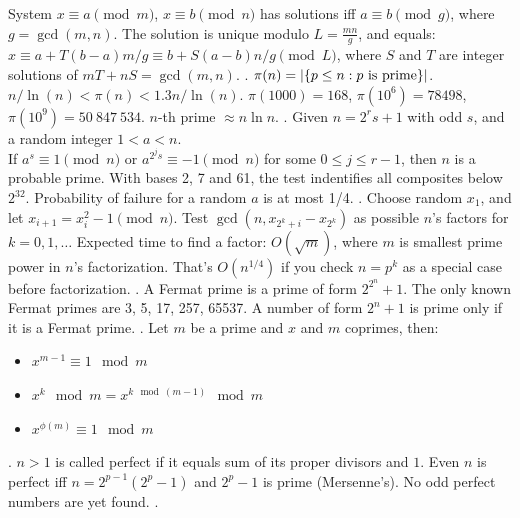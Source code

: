 System $x \equiv a \pmod{m}$, $x \equiv b \pmod{n}$ has solutions
iff $a \equiv b \pmod{g}$, where $g=\gcd(m,n)$.
The solution is unique modulo $L=\frac{mn}{g}$, and equals:
$x \equiv a + T(b-a) m/g \equiv b + S(a-b) n/g \pmod{L}$,
where $S$ and $T$ are integer solutions of $mT + nS = \gcd(m,n)$. \TopicBreak
{}. $\pi(n) = |\{p \le n : p \hbox{ is prime}\}|$.
$n/\ln(n) < \pi(n) < 1.3 n/\ln(n)$.
$\pi(1000) = 168$, $\pi(10^6) = 78498$, $\pi(10^9) = 50\ 847\ 534$.
\quad $n$-th prime $\approx n \ln n$. \TopicBreak
{}.
Given $n = 2^r s + 1$ with odd $s$, and a random integer $1 < a < n$. \\
If $a^s \equiv 1 {\pmod n}$ or $a^{2^j s} \equiv -1 {\pmod n}$ for some
$0 \le j \le r-1$, then $n$ is a probable prime.
With bases 2, 7 and 61, the test indentifies all composites below $2^{32}$.
Probability of failure for a random $a$ is at most 1/4. \TopicBreak
{}.
Choose random $x_1$, and let $x_{i+1} = x_i^2 - 1 \pmod{n}$.
Test $\gcd(n, x_{2^k+i} - x_{2^k})$ as possible $n$'s factors for $k=0,1,\ldots$
Expected time to find a factor: $O(\sqrt{m})$, where $m$ is smallest
prime power in $n$'s factorization.
That's $O(n^{1/4})$ if you check $n = p^k$ as a special case before factorization. \TopicBreak
{}.  A Fermat prime is a prime of form $2^{2^n}+1$.
The only known Fermat primes are 3, 5, 17, 257, 65537.
A number of form $2^n+1$ is prime only if it is a Fermat prime. \TopicBreak
{}. Let $m$ be a prime and $x$ and $m$ coprimes, then:
\begin{itemize}
\item $x^{m-1} \equiv 1 \mod m $
\item $x^{k} \mod m = x^{k \mod (m-1)} \mod m$
\item $x^{\phi(m)} \equiv 1 \mod m $
\end{itemize}
.  $n>1$ is called perfect if it equals
sum of its proper divisors and $1$.  Even $n$ is perfect iff $n = 2^{p-1} (2^p - 1)$
and $2^p - 1$ is prime (Mersenne's). No odd perfect numbers are yet found. \TopicBreak
{}.
